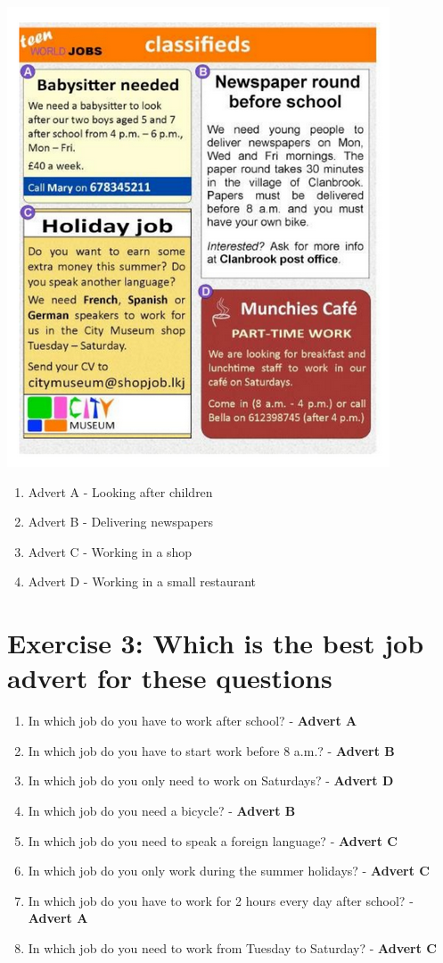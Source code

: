 \documentclass[12pt,titlepage]{article}
\begin{document}
\begin{center}
    \includegraphics*[width=.8\textwidth]{./images/classifieds.png}
\end{center}

\begin{enumerate}
    \item Advert A - Looking after children
    \item Advert B - Delivering newspapers
    \item Advert C - Working in a shop
    \item Advert D - Working in a small restaurant
\end{enumerate}

\section{Exercise 3: Which is the best job advert for these questions}

\begin{enumerate}
    \item In which job do you have to work after school? - \textbf{Advert A}
    \item In which job do you have to start work before 8 a.m.? - \textbf{Advert B}
    \item In which job do you only need to work on Saturdays? - \textbf{Advert D}
    \item In which job do you need a bicycle? - \textbf{Advert B}
    \item In which job do you need to speak a foreign language? - \textbf{Advert C}
    \item In which job do you only work during the summer holidays? - \textbf{Advert C}
    \item In which job do you have to work for 2 hours every day after school? - \textbf{Advert A}
    \item In which job do you need to work from Tuesday to Saturday? - \textbf{Advert C}
\end{enumerate}
\end{document}
